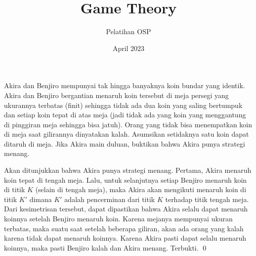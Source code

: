 \documentclass[12pt]{scrartcl}
\title{Game Theory}
\author{Pelatihan OSP}
\date{April 2023}
\begin{document}
\maketitle

\renewcommand*\contentsname{Daftar Isi}
\tableofcontents

\newpage
\begin{soaljawab}
    Akira dan Benjiro mempunyai tak hingga banyaknya koin bundar yang identik. Akira dan Benjiro bergantian menaruh koin tersebut di meja persegi yang ukurannya terbatas (finit) sehingga tidak ada dua koin yang saling bertumpuk dan setiap koin tepat di atas meja (jadi tidak ada yang koin yang menggantung di pinggiran meja sehingga bisa jatuh). Orang yang tidak bisa menempatkan koin di meja saat gilirannya dinyatakan kalah. Asumsikan setidaknya satu koin dapat ditaruh di meja. Jika Akira main duluan, buktikan bahwa Akira punya strategi menang.\\[-10pt]
    
    \begin{solusi}
    Akan ditunjukkan bahwa Akira punya strategi menang. Pertama, Akira menaruh koin tepat di tengah meja. Lalu, untuk selanjutnya setiap Benjiro menaruh koin di titik $K$ (selain di tengah meja), maka Akira akan mengikuti menaruh koin di titik $K'$ dimana $K'$ adalah pencerminan dari titik $K$ terhadap titik tengah meja. Dari kesimetrisan tersebut, dapat dipastikan bahwa Akira selalu dapat menaruh koinnya setelah Benjiro menaruh koin. Karena mejanya mempunyai ukuran terbatas, maka suatu saat setelah beberapa giliran, akan ada orang yang kalah karena tidak dapat menaruh koinnya. Karena Akira pasti dapat selalu menaruh koinnya, maka pasti Benjiro kalah dan Akira menang. Terbukti. \qed
    \end{solusi}
\end{soaljawab}
\end{document}
